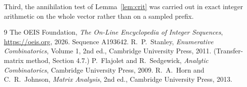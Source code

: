 \documentclass[11pt,a4paper]{article}
\theoremstyle{plain}
\theoremstyle{definition}
\begin{document}
Third, the annihilation test of Lemma~\ref{lem:crit} was carried out in exact integer
arithmetic on the whole vector rather than on a sampled prefix.

\begin{thebibliography}{9}
 The OEIS Foundation, \emph{The On-Line Encyclopedia of Integer
Sequences}, \url{https://oeis.org}, 2026. Sequence A193642.
 R.~P.~Stanley, \emph{Enumerative Combinatorics}, Volume 1, 2nd ed.,
Cambridge University Press, 2011. (Transfer-matrix method, Section 4.7.)
 P.~Flajolet and R.~Sedgewick, \emph{Analytic Combinatorics}, Cambridge
University Press, 2009.
 R.~A.~Horn and C.~R.~Johnson, \emph{Matrix Analysis}, 2nd ed., Cambridge
University Press, 2013.
\end{thebibliography}
\end{document}
